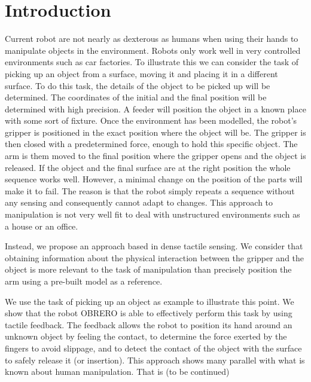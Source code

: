 \section{Introduction}
%
Current robot are not nearly as dexterous as humans when using
their hands to manipulate objects in the environment. Robots only
work well in very controlled environments such as car factories.
To illustrate this we can consider the task of picking up an
object from a surface, moving it and placing it in a different
surface. To do this task, the details of the object to be picked
up will be determined. The coordinates of the initial and the
final position will be determined with high precision. A feeder
will position the object in a known place with some sort of
fixture. Once the environment has been modelled, the robot's
gripper is positioned in the exact position where the object will
be. The gripper is then closed with a predetermined force, enough
to hold this specific object. The arm is them moved to the final
position where the gripper opens and the object is released. If
the object and the final surface are at the right position the
whole sequence works well.
%
However, a minimal change on the position of the parts will make
it to fail. The reason is that the robot simply repeats a sequence
without any sensing and consequently cannot adapt to changes.
%
This approach to manipulation is not very well fit to deal with
unstructured environments such as a house or an office.

Instead, we propose an approach based in dense tactile sensing. We
consider that obtaining information about the physical interaction
between the gripper and the object is more relevant to the task of
manipulation than precisely position the arm using a pre-built
model as a reference.

We use the task of picking up an object as example to illustrate
this point. We show that the robot OBRERO is able to effectively
perform this task by using tactile feedback. The feedback allows
the robot to position its hand around an unknown object by feeling
the contact, to determine the force exerted by the fingers to
avoid slippage, and to detect the contact of the object with the
surface to safely release it (or insertion).
%
This approach shows many parallel with what is known about human
manipulation. That is (to be continued)
